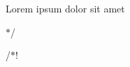 
\begin{DoxyItemize}
\item 
\item Lorem ipsum dolor sit amet
\item $\ast$/
\end{DoxyItemize}

/$\ast$! 